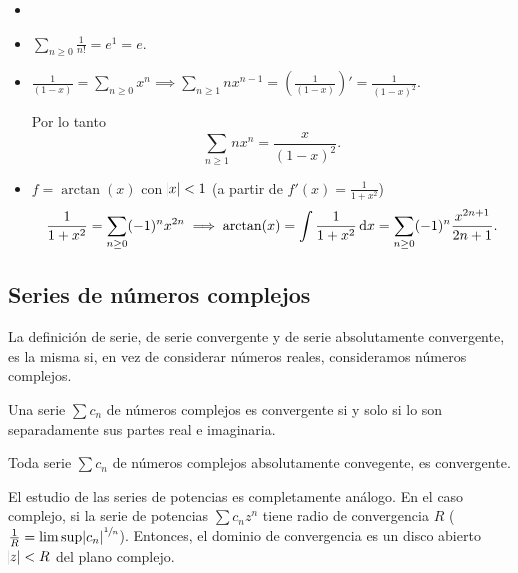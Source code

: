 \begin{example*}
    \begin{itemize}
        \item[]
        \item $\displaystyle \sum_{n \geq 0} \frac{1}{n!} = e^1 = e$.
        \item $\displaystyle \frac{1}{(1-x)} = \sum_{n \geq 0} x^n \implies
            \sum_{n \geq 1} n x^{n-1} = \left( \frac{1}{(1-x)} \right)' =
            \frac{1}{(1-x)^2}$.

            Por lo tanto
            \[
                \sum_{n \geq 1} nx^n = \frac{x}{(1-x)^2}.
            \]
        \item $f = \arctan(x)$ con $\abs{x} < 1$ (a partir de $f'(x) = \frac{1}{1+x^2}$)
            \[
                \frac{1}{1+x^2} = \sum_{n \geq 0} (-1)^n x^{2n} \implies
                \arctan(x) = \int \frac{1}{1+x^2} \dif x = \sum_{n \geq 0} (-1)^n
                \frac{x^{2n+1}}{2n+1}.
            \]
    \end{itemize}
\end{example*}

\subsection{Series de números complejos}

\begin{defi*}
    La definición de serie, de serie convergente y de serie absolutamente convergente,
    es la misma si, en vez de considerar números reales, consideramos números
    complejos.
\end{defi*}

\begin{prop*}
    Una serie $\sum c_n$ de números complejos es convergente si y solo si lo son
    separadamente sus partes real e imaginaria.
\end{prop*}

\begin{prop*}
    Toda serie $\sum c_n$ de números complejos absolutamente convegente, es
    convergente.
\end{prop*}

\begin{obs*}
    El estudio de las series de potencias es completamente análogo. En el caso
    complejo, si la serie de potencias $\sum c_n z^n$ tiene radio de convergencia
    $R$ ($\frac{1}{R} = \limsup \abs{c_n}^{\sfrac{1}{n}}$). Entonces, el dominio de
    convergencia es un disco abierto $\abs{z} < R$ del plano complejo.
\end{obs*}

